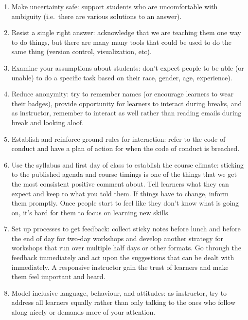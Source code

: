 
\begin{enumerate}
\item
  Make uncertainty safe: support students who are uncomfortable with
  ambiguity (i.e.~there are various solutions to an answer).
\item
  Resist a single right answer: acknowledge that we are teaching them
  one way to do things, but there are many many tools that could be used
  to do the same thing (version control, visualization, etc).
\item
  Examine your assumptions about students: don't expect people to be
  able (or unable) to do a specific task based on their race, gender,
  age, experience).
\item
  Reduce anonymity: try to remember names (or encourage learners to wear
  their badges), provide opportunity for learners to interact during
  breaks, and as instructor, remember to interact as well rather than
  reading emails during break and looking aloof.
\item
  Establish and reinforce ground rules for interaction: refer to the
  code of conduct and have a plan of action for when the code of conduct
  is breached.
\item
  Use the syllabus and first day of class to establish the course
  climate: sticking to the published agenda and course timings is one of
  the things that we get the most consistent positive comment about.
  Tell learners what they can expect and keep to what you told them. If
  things have to change, inform them promptly. Once people start to feel
  like they don't know what is going on, it's hard for them to focus on
  learning new skills.
\item
  Set up processes to get feedback: collect sticky notes before lunch
  and before the end of day for two-day workshops and develop another
  strategy for workshops that run over multiple half days or other
  formats. Go through the feedback immediately and act upon the
  suggestions that can be dealt with immediately. A responsive
  instructor gain the trust of learners and make them feel important and
  heard.
\item
  Model inclusive language, behaviour, and attitudes: as instructor, try
  to address all learners equally rather than only talking to the ones
  who follow along nicely or demands more of your attention.

\end{enumerate}
